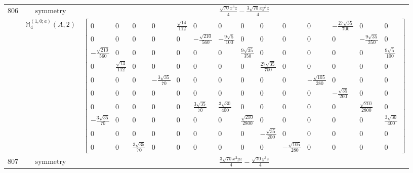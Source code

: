 \documentclass[fleqn,8pt,landscape]{jsarticle}
\begin{document}
\begin{longtable}{ccc}
$ 806 $ & $ \text{symmetry} $ & $ \frac{\sqrt{70} x^{3} z}{4} - \frac{3 \sqrt{70} x y^{2} z}{4} $ \\
$  $ & $ \mathbb{M}_{4}^{(1,0;a)}(A,2) $ & $ \begin{bmatrix} 0 & 0 & 0 & 0 & \frac{\sqrt{14}}{112} & 0 & 0 & 0 & 0 & 0 & 0 & - \frac{27 \sqrt{35}}{700} & 0 & 0 \\ 0 & 0 & 0 & 0 & 0 & - \frac{\sqrt{210}}{560} & - \frac{9 \sqrt{5}}{100} & 0 & 0 & 0 & 0 & 0 & - \frac{9 \sqrt{35}}{350} & 0 \\ - \frac{\sqrt{210}}{560} & 0 & 0 & 0 & 0 & 0 & 0 & \frac{9 \sqrt{35}}{350} & 0 & 0 & 0 & 0 & 0 & \frac{9 \sqrt{5}}{100} \\ 0 & \frac{\sqrt{14}}{112} & 0 & 0 & 0 & 0 & 0 & 0 & \frac{27 \sqrt{35}}{700} & 0 & 0 & 0 & 0 & 0 \\ 0 & 0 & 0 & - \frac{3 \sqrt{35}}{70} & 0 & 0 & 0 & 0 & 0 & 0 & - \frac{\sqrt{105}}{280} & 0 & 0 & 0 \\ 0 & 0 & 0 & 0 & 0 & 0 & 0 & 0 & 0 & 0 & 0 & - \frac{\sqrt{35}}{200} & 0 & 0 \\ 0 & 0 & 0 & 0 & 0 & \frac{3 \sqrt{35}}{70} & \frac{3 \sqrt{30}}{400} & 0 & 0 & 0 & 0 & 0 & \frac{\sqrt{210}}{2800} & 0 \\ - \frac{3 \sqrt{35}}{70} & 0 & 0 & 0 & 0 & 0 & 0 & \frac{\sqrt{210}}{2800} & 0 & 0 & 0 & 0 & 0 & \frac{3 \sqrt{30}}{400} \\ 0 & 0 & 0 & 0 & 0 & 0 & 0 & 0 & - \frac{\sqrt{35}}{200} & 0 & 0 & 0 & 0 & 0 \\ 0 & 0 & \frac{3 \sqrt{35}}{70} & 0 & 0 & 0 & 0 & 0 & 0 & - \frac{\sqrt{105}}{280} & 0 & 0 & 0 & 0 \end{bmatrix} $ \\ \hline
$ 807 $ & $ \text{symmetry} $ & $ \frac{3 \sqrt{70} x^{2} y z}{4} - \frac{\sqrt{70} y^{3} z}{4} $ \\

\end{longtable}
\end{document}
